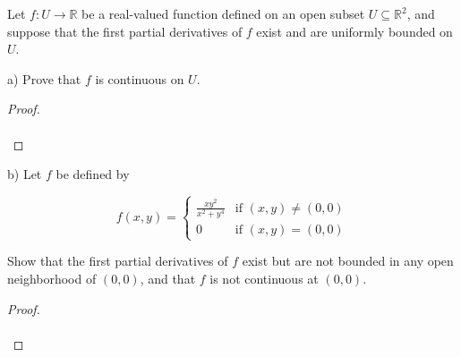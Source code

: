 Let $f:U \to \mathbb{R}$ be a real-valued function defined on an open subset $U \subseteq \mathbb{R}^2$, and suppose
that the first partial derivatives of $f$ exist and are uniformly bounded on $U$.

a) Prove that $f$ is continuous on $U$.

\begin{proof}\renewcommand{\qedsymbol}{}\ \\\\
\end{proof}

\pagebreak

b) Let $f$ be defined by 

   $$
   f(x, y) = \begin{cases}
     \frac{xy^2}{x^2 + y^4} &\text{if } (x, y) \neq (0, 0) \\
     0    &\text{if } (x, y) = (0, 0)
   \end{cases} 
   $$

   Show that the first partial derivatives of $f$ exist but are not bounded in any open neighborhood of $(0, 0)$, and
   that $f$ is not continuous at $(0, 0)$.

\begin{proof}\renewcommand{\qedsymbol}{}\ \\\\
\end{proof}
